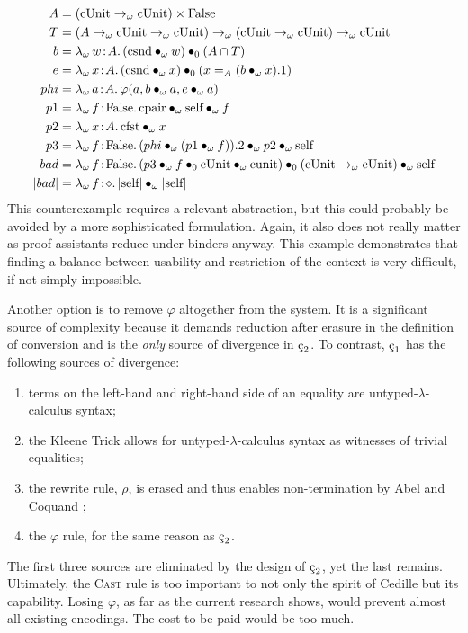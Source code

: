 \begin{align*}
    A &= (\pUnit \to_\omega \pUnit) \times \pFalse \\
    T &= (A \to_\omega \pUnit \to_\omega \pUnit) \to_\omega (\pUnit \to_\omega \pUnit) \to_\omega \pUnit \\
    b &= \abs{\lambda_\omega}{w}{A}{
        \app{(\app{\psnd}{\omega}{w})}{0}{(A \cap T)}
    } \\
    e &= \abs{\lambda_\omega}{x}{A}{
        \app{(\app{\psnd}{\omega}{x})}{0}{(x =_A (\app{b}{\omega}{x}).1)}
    } \\
    phi &= \abs{\lambda_\omega}{a}{A}{\varphi(a, \app{b}{\omega}{a}, \app{e}{\omega}{a})} \\
    p1 &= \abs{\lambda_\omega}{f}{\pFalse}{\apptwo{\ppair}{\omega}{\pself}{\omega}{f}} \\
    p2 &= \abs{\lambda_\omega}{x}{A}{\app{\pfst}{\omega}{x}} \\
    p3 &= \abs{\lambda_\omega}{f}{\pFalse}{
        \apptwo{(\app{phi}{\omega}{(\app{p1}{\omega}{f})}).2}
            {\omega}{p2}
            {\omega}{\pself}
    } \\
    bad &= \abs{\lambda_\omega}{f}{\pFalse}{
        \apptwo{(\appthr{p3}{\omega}{f}{0}{\pUnit}{\omega}{\punit})}
            {0}{(\pUnit \to_\omega \pUnit)}
            {\omega}{\pself}
    } \\
    |bad| &= \abs{\lambda_\omega}{f}{\diamond}{\app{|\pself|}{\omega}{|\pself|}}
\end{align*}
This counterexample requires a relevant abstraction, but this could probably be avoided by a more sophisticated formulation.
Again, it also does not really matter as proof assistants reduce under binders anyway.
This example demonstrates that finding a balance between usability and restriction of the context is very difficult, if not simply impossible.

Another option is to remove $\varphi$ altogether from the system.
It is a significant source of complexity because it demands reduction after erasure in the definition of conversion and is the \textit{only} source of divergence in $\ced$.
To contrast, $\oldced$ has the following sources of divergence:
\begin{enumerate}
    \item terms on the left-hand and right-hand side of an equality are untyped-$\lambda$-calculus syntax;
    \item the Kleene Trick allows for untyped-$\lambda$-calculus syntax as witnesses of trivial equalities;
    \item the rewrite rule, $\rho$, is erased and thus enables non-termination by Abel and Coquand \cite{abel2020_normalization};
    \item the $\varphi$ rule, for the same reason as $\ced$.
\end{enumerate}
The first three sources are eliminated by the design of $\ced$, yet the last remains.
Ultimately, the \textsc{Cast} rule is too important to not only the spirit of Cedille but its capability.
Losing $\varphi$, as far as the current research shows, would prevent almost all existing encodings.
The cost to be paid would be too much.
